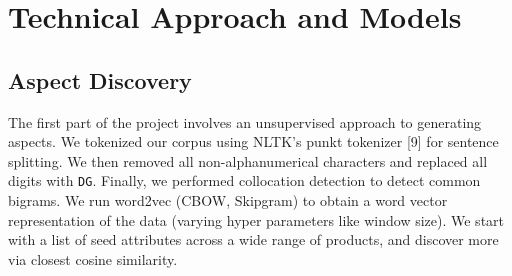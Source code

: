 \documentclass{article} %
\begin{document}




\section{Technical Approach and Models} 





\subsection{Aspect Discovery}

The first part of the project involves an unsupervised approach to generating aspects. We tokenized our corpus using NLTK's punkt tokenizer [9] for sentence splitting. We then removed all non-alphanumerical characters and replaced all digits with \texttt{DG}. Finally, we performed collocation detection to detect common bigrams. We run word2vec (CBOW, Skipgram) to obtain a word vector representation of the data (varying hyper parameters like window size). We start with a list of seed attributes across a wide range of products, and discover more via closest cosine similarity.


\end{document}
